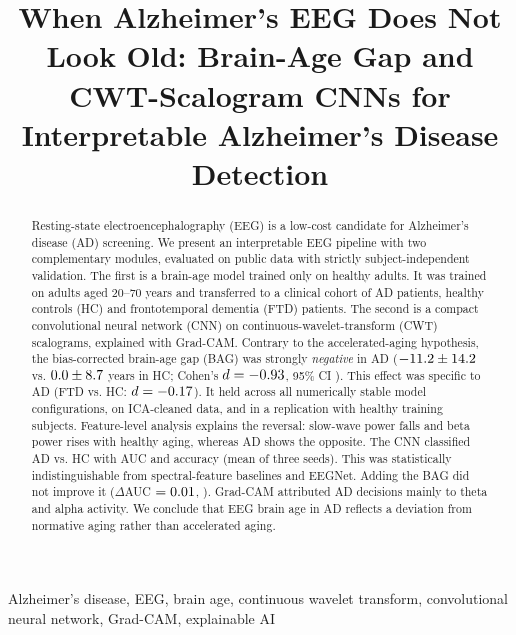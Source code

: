 \documentclass[conference]{IEEEtran}
\begin{document}
\title{When Alzheimer's EEG Does Not Look Old: Brain-Age Gap and CWT-Scalogram CNNs for Interpretable Alzheimer's Disease Detection}

\author{
}

\maketitle

\begin{abstract}
Resting-state electroencephalography (EEG) is a low-cost candidate for Alzheimer's disease (AD) screening. We present an interpretable EEG pipeline with two complementary modules, evaluated on public data with strictly subject-independent validation. The first is a brain-age model trained only on healthy adults. It was trained on \dmN{} adults aged 20--70 years and transferred to a clinical cohort of \nAD{} AD patients, \nHC{} healthy controls (HC) and \nFTD{} frontotemporal dementia (FTD) patients. The second is a compact convolutional neural network (CNN) on continuous-wavelet-transform (CWT) scalograms, explained with Grad-CAM. Contrary to the accelerated-aging hypothesis, the bias-corrected brain-age gap (BAG) was strongly \emph{negative} in AD ($-11.2{}\pm14.2{}$ vs. $0.0{}\pm8.7{}$ years in HC; Cohen's $d=-0.93{}$, 95\% CI \bagDci{}). This effect was specific to AD (FTD vs. HC: $d=-0.17{}$). It held across all numerically stable model configurations, on ICA-cleaned data, and in a replication with \repNok{} healthy training subjects. Feature-level analysis explains the reversal: slow-wave power falls and beta power rises with healthy aging, whereas AD shows the opposite. The CNN classified AD vs. HC with AUC \cnnAUC{} and accuracy \cnnAcc{} (mean of three seeds). This was statistically indistinguishable from spectral-feature baselines and EEGNet. Adding the BAG did not improve it ($\Delta$AUC $=0.01{}$, \combP{}). Grad-CAM attributed AD decisions mainly to theta and alpha activity. We conclude that EEG brain age in AD reflects a deviation from normative aging rather than accelerated aging.
\end{abstract}

\begin{IEEEkeywords}
Alzheimer's disease, EEG, brain age, continuous wavelet transform, convolutional neural network, Grad-CAM, explainable AI
\end{IEEEkeywords}
\end{document}
